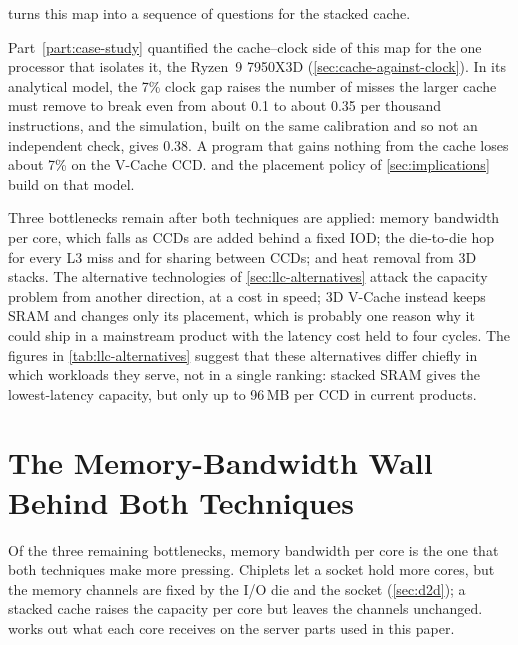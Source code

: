  turns this map into a sequence of questions for the stacked cache.



Part~\ref{part:case-study} quantified the cache--clock side of this map for the one processor that isolates it, the Ryzen~9 7950X3D (\cref{sec:cache-against-clock}). In its analytical model, the 7\% clock gap raises the number of misses the larger cache must remove to break even from about 0.1 to about 0.35 per thousand instructions, and the simulation, built on the same calibration and so not an independent check, gives 0.38. A program that gains nothing from the cache loses about 7\% on the V-Cache CCD.  and the placement policy of \cref{sec:implications} build on that model.

Three bottlenecks remain after both techniques are applied: memory bandwidth per core, which falls as CCDs are added behind a fixed IOD; the die-to-die hop for every L3 miss and for sharing between CCDs; and heat removal from 3D stacks. The alternative technologies of \cref{sec:llc-alternatives} attack the capacity problem from another direction, at a cost in speed; 3D V-Cache instead keeps SRAM and changes only its placement, which is probably one reason why it could ship in a mainstream product with the latency cost held to four cycles. The figures in \cref{tab:llc-alternatives} suggest that these alternatives differ chiefly in which workloads they serve, not in a single ranking: stacked SRAM gives the lowest-latency capacity, but only up to 96\,MB per CCD in current products.

\section{The Memory-Bandwidth Wall Behind Both Techniques}
\label{sec:bandwidth-wall}
Of the three remaining bottlenecks, memory bandwidth per core is the one that both techniques make more pressing. Chiplets let a socket hold more cores, but the memory channels are fixed by the I/O die and the socket (\cref{sec:d2d}); a stacked cache raises the capacity per core but leaves the channels unchanged.  works out what each core receives on the server parts used in this paper.

